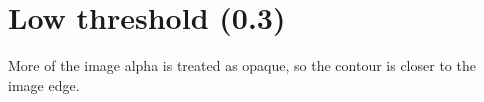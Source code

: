 \documentclass{article}
\begin{document}
\section*{Low threshold (0.3)}

More of the image alpha is treated as opaque,
so the contour is closer to the image edge.

\lipsum[1-5]
\end{document}
